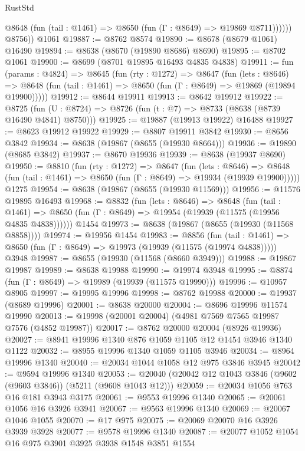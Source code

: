 \begin{lexlean}{RustStd}
\begin{coremodule}
              @8648 (fun (tail : @1461) => @8650 (fun (Γ : @8649) => @19869 @8711))))))
        @8756))
    @1061
@19887 := @8762 @8574
@19890 := @8678 (@8679 @1061) @16490
@19894 := @8638 (@8670 (@19890 @8686) @8690)
@19895 := @8702 @1061
@19900 := @8699 (@8701 @19895 @16493 @4835 @4838)
@19911 := fun (params : @4824) =>
  @8645
    (fun (rty : @1272) =>
    @8647
      (fun (lets : @8646) =>
      @8648 (fun (tail : @1461) => @8650 (fun (Γ : @8649) => @19869 (@19894 @19900)))))
@19912 := @8644 @19911
@19913 := @8642 @19912
@19922 := @8725
    (fun (U : @8724) => @8726 (fun (t : @7) => @8733 (@8638 (@8739 @16490 @4841) @8750)))
@19925 := @19887 (@19913 @19922) @16488
@19927 := @8623 @19912 @19922
@19929 := @8807 @19911 @3842
@19930 := @8656 @3842
@19934 := @8638 (@19867 (@8655 (@19930 @8664)))
@19936 := @19890 (@8685 @3842)
@19937 := @8670 @19936
@19939 := @8638 (@19937 @8690)
@19950 := @8810
    (fun (rty : @1272) =>
    @8647
      (fun (lets : @8646) =>
      @8648 (fun (tail : @1461) => @8650 (fun (Γ : @8649) => @19934 (@19939 @19900)))))
    @1275
@19954 := @8638 (@19867 (@8655 (@19930 @11569)))
@19956 := @11576 @19895 @16493
@19968 := @8832
    (fun (lets : @8646) =>
    @8648
      (fun (tail : @1461) =>
      @8650 (fun (Γ : @8649) => @19954 (@19939 (@11575 (@19956 @4835 @4838))))))
    @1454
@19973 := @8638 (@19867 (@8655 (@19930 (@11568 @8858))))
@19974 := @19956 @1454
@19983 := @8856
    (fun (tail : @1461) => @8650 (fun (Γ : @8649) => @19973 (@19939 (@11575 (@19974 @4838)))))
    @3948
@19987 := @8655 (@19930 (@11568 (@8660 @3949)))
@19988 := @19867 @19987
@19989 := @8638 @19988
@19990 := @19974 @3948
@19995 := @8874 (fun (Γ : @8649) => @19989 (@19939 (@11575 @19990)))
@19996 := @10957 @8905
@19997 := @19995 @19996
@19998 := @8762 @19988
@20000 := @19937 (@8689 @19996)
@20001 := @8638 @20000
@20004 := @8696 @19996 @11574 @19990
@20013 := @19998 (@20001 @20004) (@4981 @7569 @7565 @19987 @7576 (@4852 @19987))
@20017 := @8762 @20000 @20004 (@8926 @19936)
@20027 := @8941 @19996 @1340 @876 @1059 @1105 @12 @1454 @3946 @1340 @1122
@20032 := @8955 @19996 @1340 @1059 @1105 @3946
@20034 := @8964 @19996 @1340
@20040 := @20034 @1044 @1058 @12 @975 @3846 @3945
@20042 := @9594 @19996 @1340
@20053 := @20040 (@20042 @12 @1043 @3846 (@9602 (@9603 @3846)) (@5211 (@9608 @1043 @12)))
@20059 := @20034 @1056 @763 @16 @181 @3943 @3175
@20061 := @9553 @19996 @1340
@20065 := @20061 @1056 @16 @3926 @3941
@20067 := @9563 @19996 @1340
@20069 := @20067 @1046 @1055
@20070 := @17 @975
@20075 := @20069 @20070 @16 @3926 @3939 @3928
@20077 := @9578 @19996 @1340
@20087 := @20077 @1052 @1054 @16 @975 @3901 @3925 @3938 @1548 @3851 @1554

\end{coremodule}
\end{lexlean}
